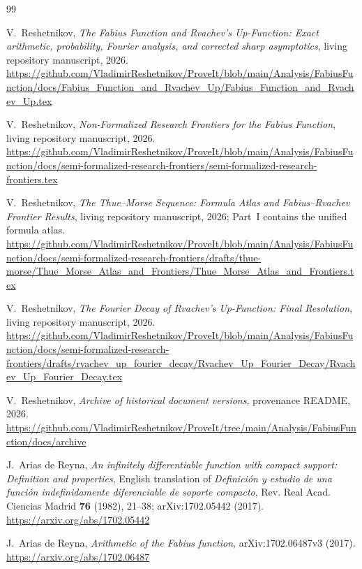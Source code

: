 \documentclass[11pt,oneside]{article}
\numberwithin{equation}{section}
\theoremstyle{definition}
\theoremstyle{remark}
\begin{document}
\begin{thebibliography}{99}

V.~Reshetnikov,
\emph{The Fabius Function and Rvachev's Up-Function: Exact arithmetic, probability, Fourier
analysis, and corrected sharp asymptotics}, living repository manuscript, 2026.
\url{https://github.com/VladimirReshetnikov/ProveIt/blob/main/Analysis/FabiusFunction/docs/Fabius_Function_and_Rvachev_Up/Fabius_Function_and_Rvachev_Up.tex}

V.~Reshetnikov,
\emph{Non-Formalized Research Frontiers for the Fabius Function}, living repository
manuscript, 2026.
\url{https://github.com/VladimirReshetnikov/ProveIt/blob/main/Analysis/FabiusFunction/docs/semi-formalized-research-frontiers/semi-formalized-research-frontiers.tex}

V.~Reshetnikov,
\emph{The Thue--Morse Sequence: Formula Atlas and Fabius--Rvachev Frontier Results}, living
repository manuscript, 2026; Part~I contains the unified formula atlas.
\url{https://github.com/VladimirReshetnikov/ProveIt/blob/main/Analysis/FabiusFunction/docs/semi-formalized-research-frontiers/drafts/thue-morse/Thue_Morse_Atlas_and_Frontiers/Thue_Morse_Atlas_and_Frontiers.tex}

V.~Reshetnikov,
\emph{The Fourier Decay of Rvachev's Up-Function: Final Resolution}, living repository
manuscript, 2026.
\url{https://github.com/VladimirReshetnikov/ProveIt/blob/main/Analysis/FabiusFunction/docs/semi-formalized-research-frontiers/drafts/rvachev_up_fourier_decay/Rvachev_Up_Fourier_Decay/Rvachev_Up_Fourier_Decay.tex}

V.~Reshetnikov,
\emph{Archive of historical document versions}, provenance README, 2026.
\url{https://github.com/VladimirReshetnikov/ProveIt/tree/main/Analysis/FabiusFunction/docs/archive}

J.~Arias de Reyna,
\emph{An infinitely differentiable function with compact support: Definition and properties},
English translation of \emph{Definici\'on y estudio de una funci\'on indefinidamente
diferenciable de soporte compacto}, Rev. Real Acad. Ciencias Madrid \textbf{76} (1982),
21--38; arXiv:1702.05442 (2017).
\url{https://arxiv.org/abs/1702.05442}

J.~Arias de Reyna,
\emph{Arithmetic of the Fabius function}, arXiv:1702.06487v3 (2017).
\url{https://arxiv.org/abs/1702.06487}


\end{thebibliography}
\end{document}
